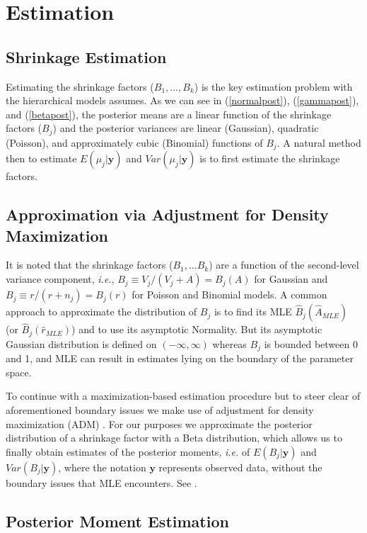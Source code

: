 \documentclass[article]{jss}
\begin{document}
\section[Estimation]{Estimation}

\subsection[Shrinkage Estimation]{Shrinkage Estimation}
Estimating the shrinkage factors ($B_1, \ldots, B_k$) is the key estimation problem with the hierarchical models  assumes. As we can see in (\ref{normalpost}), (\ref{gammapost}), and (\ref{betapost}), the posterior means are a linear function of the shrinkage factors ($B_{j}$) and the posterior variances are linear (Gaussian), quadratic (Poisson), and  approximately cubic (Binomial) functions of $B_{j}$. A natural method then to estimate $E(\mu_{j}\vert \textbf{y})$ and $Var(\mu_{j}\vert \textbf{y})$ is to first estimate the shrinkage factors.

\subsection[ADM]{Approximation via Adjustment for Density Maximization}\label{ADM}
It is noted that the shrinkage factors ($B_1, \ldots B_k$) are a function of the second-level variance component, \emph{i.e.}, $B_{j}\equiv V_{j}/(V_{j}+A)=B_{j}(A)$ for Gaussian and $B_{j}\equiv r/(r+n_{j})=B_{j}(r)$ for Poisson and Binomial models. A common approach to approximate the distribution of $B_{j}$ is to find its MLE $\hat{B}_{j}(\hat{A}_{MLE})$ (or  $\hat{B}_{j}(\hat{r}_{MLE})$) and to use its asymptotic Normality. But its asymptotic Gaussian distribution is defined on $(-\infty, \infty)$ whereas $B_{j}$ is bounded between 0 and 1, and MLE can result in estimates lying on the boundary of the parameter space.

To continue with a maximization-based estimation procedure but to steer clear of aforementioned boundary issues we make use of adjustment for density maximization (ADM) \citep{carl1988, 1997, 2011}. For our purposes we approximate the posterior distribution of a shrinkage factor with a Beta distribution, which allows us to finally obtain estimates of the posterior moments, \emph{i.e.}  of $E(B_{j}\vert\textbf{y})$ and $Var(B_{j}\vert\textbf{y})$, where the notation $\textbf{y}$ represents observed data, without the boundary issues that MLE encounters. See \cite{2011}.

\subsection[Posterior Moment Estimation]{Posterior Moment Estimation}
\end{document}
